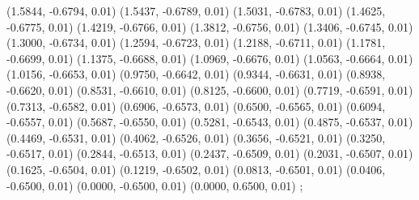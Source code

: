 {    (1.5844, -0.6794, 0.01)
    (1.5437, -0.6789, 0.01)
    (1.5031, -0.6783, 0.01)
    (1.4625, -0.6775, 0.01)
    (1.4219, -0.6766, 0.01)
    (1.3812, -0.6756, 0.01)
    (1.3406, -0.6745, 0.01)
    (1.3000, -0.6734, 0.01)
    (1.2594, -0.6723, 0.01)
    (1.2188, -0.6711, 0.01)
    (1.1781, -0.6699, 0.01)
    (1.1375, -0.6688, 0.01)
    (1.0969, -0.6676, 0.01)
    (1.0563, -0.6664, 0.01)
    (1.0156, -0.6653, 0.01)
    (0.9750, -0.6642, 0.01)
    (0.9344, -0.6631, 0.01)
    (0.8938, -0.6620, 0.01)
    (0.8531, -0.6610, 0.01)
    (0.8125, -0.6600, 0.01)
    (0.7719, -0.6591, 0.01)
    (0.7313, -0.6582, 0.01)
    (0.6906, -0.6573, 0.01)
    (0.6500, -0.6565, 0.01)
    (0.6094, -0.6557, 0.01)
    (0.5687, -0.6550, 0.01)
    (0.5281, -0.6543, 0.01)
    (0.4875, -0.6537, 0.01)
    (0.4469, -0.6531, 0.01)
    (0.4062, -0.6526, 0.01)
    (0.3656, -0.6521, 0.01)
    (0.3250, -0.6517, 0.01)
    (0.2844, -0.6513, 0.01)
    (0.2437, -0.6509, 0.01)
    (0.2031, -0.6507, 0.01)
    (0.1625, -0.6504, 0.01)
    (0.1219, -0.6502, 0.01)
    (0.0813, -0.6501, 0.01)
    (0.0406, -0.6500, 0.01)
    (0.0000, -0.6500, 0.01)
    (0.0000, 0.6500, 0.01)
};
